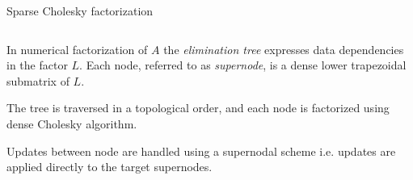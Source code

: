 \documentclass[unknownkeysallowed]{beamer}
\newcommand{\db}[1]{\textcolor{mblue}{#1\xspace}}
\begin{document}
\begin{frame}{Sparse Cholesky factorization}
  
  \begin{columns}  

    \begin{column}{0.6\textwidth}  

      In numerical factorization of \alert{$A$} the
      \db{\textit{elimination tree}} expresses data dependencies in
      the factor \alert{$L$}. Each node, referred to as
      \db{\textit{supernode}}, is a \alert{dense} lower trapezoidal
      \alert{submatrix} of \alert{$L$}.

      \vspace{0.4cm}

      The tree is traversed in a \db{topological order}, and each node is
      factorized using \alert{dense Cholesky algorithm}.

      \vspace{0.4cm}
      
      Updates between node are handled using a \alert{supernodal scheme}
      i.e. updates are applied directly to the target supernodes.
    \end{column}


\end{columns}
\end{frame}
\end{document}

